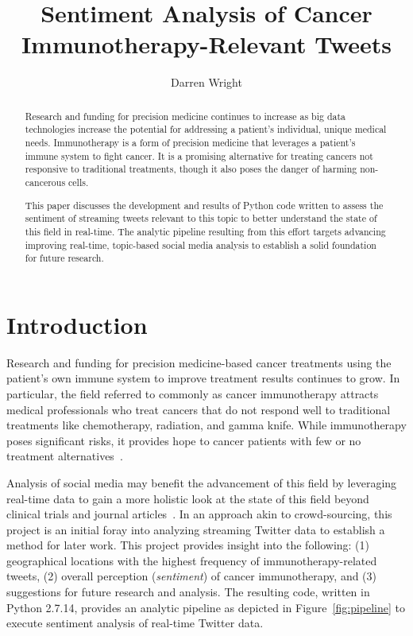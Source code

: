 
\title{Sentiment Analysis of Cancer Immunotherapy-Relevant Tweets}


\author{Darren Wright}

\begin{abstract}
  Research and funding for precision medicine continues to increase as
  big data technologies increase the potential for addressing a
  patient's individual, unique medical needs.  Immunotherapy is a form
  of precision medicine that leverages a patient's immune system to
  fight cancer.  It is a promising alternative for treating cancers
  not responsive to traditional treatments, though it also poses the
  danger of harming non-cancerous cells.

  This paper discusses the development and results of Python code
  written to assess the sentiment of streaming tweets relevant to this
  topic to better understand the state of this field in real-time.
  The analytic pipeline resulting from this effort targets advancing
  improving real-time, topic-based social media analysis to establish
  a solid foundation for future research.
\end{abstract}

\maketitle

\section{Introduction}

Research and funding for precision medicine-based cancer treatments
using the patient's own immune system to improve treatment results
continues to grow.  In particular, the field referred to commonly as
cancer immunotherapy attracts medical professionals who treat cancers
that do not respond well to traditional treatments like chemotherapy,
radiation, and gamma knife.  While immunotherapy poses significant
risks, it provides hope to cancer patients with few or no treatment
alternatives~\cite{hopkins2017}.
	
Analysis of social media may benefit the advancement of this field by
leveraging real-time data to gain a more holistic look at the state of
this field beyond clinical trials and journal
articles~\cite{kaya2017}.  In an approach akin to crowd-sourcing, this
project is an initial foray into analyzing streaming Twitter data to
establish a method for later work.  This project provides insight into
the following: (1) geographical locations with the highest frequency
of immunotherapy-related tweets, (2) overall perception
(\emph{sentiment}) of cancer immunotherapy, and (3) suggestions for
future research and analysis.  The resulting code, written in Python
2.7.14, provides an analytic pipeline as depicted in
Figure~\ref{fig:pipeline} to execute sentiment analysis of real-time
Twitter data.

